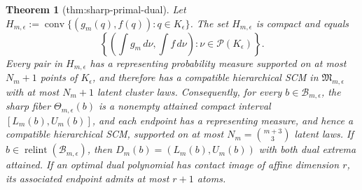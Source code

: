 \documentclass{article}
\newtheorem{theorem}{Theorem}
\begin{document}
\begin{theorem}[thm:sharp-primal-dual]\label{thm:sharp-primal-dual}
Let \(H_{m,\epsilon}:=\operatorname{conv}\{(g_m(q),f(q)):q\in K_{\epsilon}\}\). The set \(H_{m,\epsilon}\) is compact and equals
\[
 \left\{\left(\int g_m\,d\nu,\int f\,d\nu\right):
 \nu\in\mathcal P(K_{\epsilon})\right\}.
\]
Every pair in \(H_{m,\epsilon}\) has a representing probability measure supported on at most \(N_m+1\) points of \(K_{\epsilon}\), and therefore has a compatible hierarchical SCM in \(\mathfrak M_{m,\epsilon}\) with at most \(N_m+1\) latent cluster laws. Consequently, for every \(b\in\mathcal B_{m,\epsilon}\), the sharp fiber \(\Theta_{m,\epsilon}(b)\) is a nonempty attained compact interval \([L_m(b),U_m(b)]\), and each endpoint has a representing measure, and hence a compatible hierarchical SCM, supported on at most \(N_m={m+3\choose3}\) latent laws. If \(b\in\operatorname{relint}(\mathcal B_{m,\epsilon})\), then \(D_m(b)=(L_m(b),U_m(b))\) with both dual extrema attained. If an optimal dual polynomial has contact image of affine dimension \(r\), its associated endpoint admits at most \(r+1\) atoms.
\end{theorem}
\end{document}
